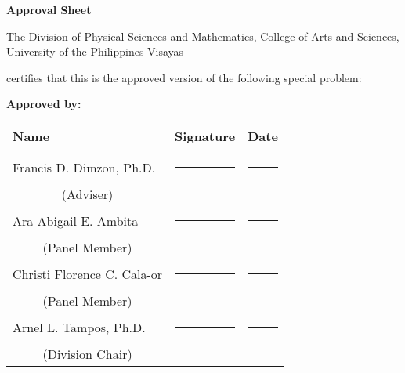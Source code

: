 \begin{center}
    \textbf{Approval Sheet}

    The Division of Physical Sciences and Mathematics, College of Arts and Sciences, University of the Philippines Visayas

    certifies that this is the approved version of the following special problem:

    \end{center}

    {\small\textbf{Approved by:}}

    \newcommand{\signaturerule}{\rule{10em}{.4pt}}
        \begin{tabular}{lll}
            \bfseries Name  & \bfseries Signature & \bfseries Date\\ \\
            Francis D. Dimzon, Ph.D. &\signaturerule  & \signaturerule\\
            \multicolumn{1}{c}{(Adviser)} \\
            Ara Abigail E. Ambita &\signaturerule &\signaturerule\\
            \multicolumn{1}{c}{(Panel Member)}  \\
            Christi Florence C. Cala-or  &\signaturerule &\signaturerule\\
            \multicolumn{1}{c}{(Panel Member)}  \\
            Arnel L. Tampos, Ph.D. &\signaturerule &\signaturerule\\
            \multicolumn{1}{c}{(Division Chair)}

        \end{tabular}
